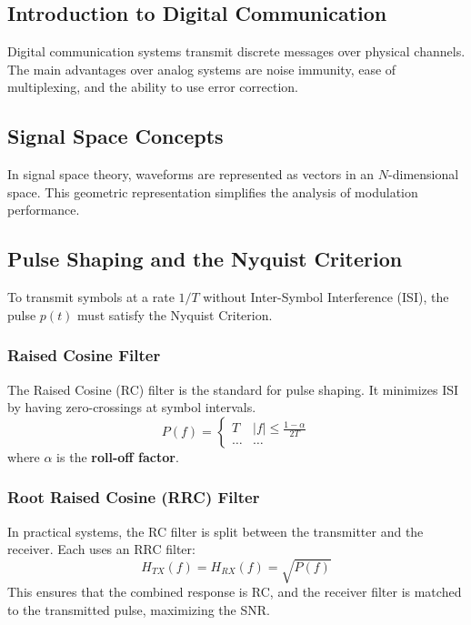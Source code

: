 
\subsection{Introduction to Digital Communication}
Digital communication systems transmit discrete messages over physical channels. The main advantages over analog systems are noise immunity, ease of multiplexing, and the ability to use error correction.

\subsection{Signal Space Concepts}
In signal space theory, waveforms are represented as vectors in an $N$-dimensional space. This geometric representation simplifies the analysis of modulation performance.

\subsection{Pulse Shaping and the Nyquist Criterion}
To transmit symbols at a rate $1/T$ without Inter-Symbol Interference (ISI), the pulse $p(t)$ must satisfy the Nyquist Criterion.

\subsubsection{Raised Cosine Filter}
The Raised Cosine (RC) filter is the standard for pulse shaping. It minimizes ISI by having zero-crossings at symbol intervals.
\begin{equation}
    P(f) = \begin{cases} T & |f| \leq \frac{1-\alpha}{2T} \\ \dots & \dots \end{cases}
\end{equation}
where $\alpha$ is the \textbf{roll-off factor}.

\subsubsection{Root Raised Cosine (RRC) Filter}
In practical systems, the RC filter is split between the transmitter and the receiver. Each uses an RRC filter:
\begin{equation}
    H_{TX}(f) = H_{RX}(f) = \sqrt{P(f)}
\end{equation}
This ensures that the combined response is RC, and the receiver filter is matched to the transmitted pulse, maximizing the SNR.

